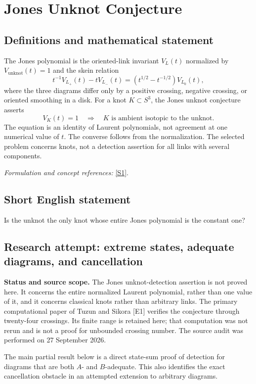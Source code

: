 \documentclass[11pt]{article}
\begin{document}
\section*{\texorpdfstring{Jones Unknot Conjecture}{Jones Unknot Conjecture}}\label{30006869}
\subsection{Definitions and mathematical statement}
The Jones polynomial is the oriented-link invariant $V_L(t)$ normalized by $V_{\mathrm{unknot}}(t)=1$ and the skein relation
\[
 t^{-1}V_{L_+}(t)-tV_{L_-}(t)
 =(t^{1/2}-t^{-1/2})V_{L_0}(t),
\]
where the three diagrams differ only by a positive crossing, negative crossing, or oriented smoothing in a disk. For a knot $K\subset S^3$, the Jones unknot conjecture asserts
\[
 V_K(t)=1\quad\Longrightarrow\quad K\text{ is ambient isotopic to the unknot}.
\]
The equation is an identity of Laurent polynomials, not agreement at one numerical value of $t$. The converse follows from the normalization. The selected problem concerns knots, not a detection assertion for all links with several components.
\par\smallskip\textit{Formulation and concept references:} \href{https://encyclopediaofmath.org/wiki/Jones_unknotting_conjecture}{[S1]}.

\subsection{Short English statement}
Is the unknot the only knot whose entire Jones polynomial is the constant one?
\subsection{Research attempt: extreme states, adequate diagrams, and cancellation}
\textbf{Status and source scope.} The Jones unknot-detection assertion is not proved here. It concerns the entire normalized Laurent polynomial, rather than one value of it, and it concerns classical knots rather than arbitrary links. The primary computational paper of Tuzun and Sikora [E1] verifies the conjecture through twenty-four crossings. Its finite range is retained here; that computation was not rerun and is not a proof for unbounded crossing number. The source audit was performed on 27 September 2026.

The main partial result below is a direct state-sum proof of detection for diagrams that are both $A$- and $B$-adequate. This also identifies the exact cancellation obstacle in an attempted extension to arbitrary diagrams.
\end{document}
